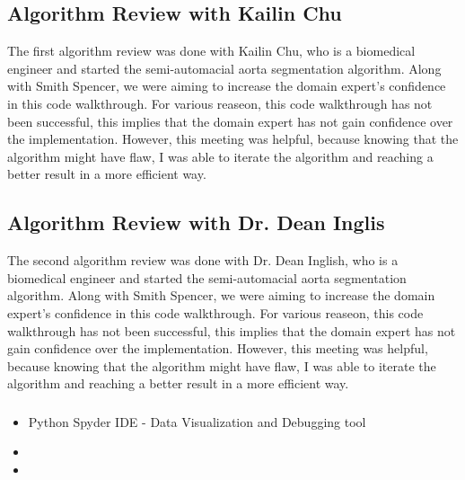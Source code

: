 \subsection{Algorithm Review with Kailin Chu}
The first algorithm review was done with Kailin Chu, who is a biomedical engineer and started the semi-automacial aorta segmentation algorithm. Along with Smith Spencer, we were aiming to increase the domain expert's confidence in this code walkthrough. For various reaseon, this code walkthrough has not been successful, this implies that the domain expert has not gain confidence over the implementation. However, this meeting was helpful, because knowing that the algorithm might have flaw, I was able to iterate the algorithm and reaching a better result in a more efficient way.

\subsection{Algorithm Review with Dr. Dean Inglis}

The second algorithm review was done with Dr. Dean Inglish, who is a biomedical engineer and started the semi-automacial aorta segmentation algorithm. Along with Smith Spencer, we were aiming to increase the domain expert's confidence in this code walkthrough. For various reaseon, this code walkthrough has not been successful, this implies that the domain expert has not gain confidence over the implementation. However, this meeting was helpful, because knowing that the algorithm might have flaw, I was able to iterate the algorithm and reaching a better result in a more efficient way.
\subsubsection{}


\begin{itemize}
\item Python Spyder IDE - Data Visualization and Debugging tool
\item 
\item 
\end{itemize}


